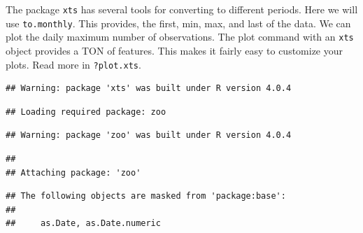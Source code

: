 \documentclass[
  10pt,
]{article}
\newenvironment{Shaded}{\begin{snugshade}}{\end{snugshade}}
\newcommand{\AttributeTok}[1]{\textcolor[rgb]{0.77,0.63,0.00}{#1}}
\newcommand{\DecValTok}[1]{\textcolor[rgb]{0.00,0.00,0.81}{#1}}
\newcommand{\FunctionTok}[1]{\textcolor[rgb]{0.00,0.00,0.00}{#1}}
\newcommand{\NormalTok}[1]{#1}
\newcommand{\OtherTok}[1]{\textcolor[rgb]{0.56,0.35,0.01}{#1}}
\newcommand{\SpecialCharTok}[1]{\textcolor[rgb]{0.00,0.00,0.00}{#1}}
\newcommand{\StringTok}[1]{\textcolor[rgb]{0.31,0.60,0.02}{#1}}
\begin{document}
The package \texttt{xts} has several tools for converting to different periods. Here we
will use \texttt{to.monthly}. This provides, the first, min, max, and last of the data.
We can plot the daily maximum number of observations. The plot command with an
\texttt{xts} object provides a TON of features. This makes it fairly easy to customize
your plots. Read more in \texttt{?plot.xts}.

\begin{Shaded}
\end{Shaded}

\begin{verbatim}
## Warning: package 'xts' was built under R version 4.0.4
\end{verbatim}

\begin{verbatim}
## Loading required package: zoo
\end{verbatim}

\begin{verbatim}
## Warning: package 'zoo' was built under R version 4.0.4
\end{verbatim}

\begin{verbatim}
## 
## Attaching package: 'zoo'
\end{verbatim}

\begin{verbatim}
## The following objects are masked from 'package:base':
## 
##     as.Date, as.Date.numeric
\end{verbatim}
\end{document}
